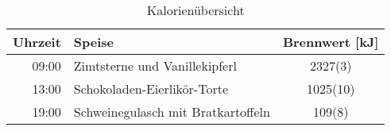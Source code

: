 \documentclass{scrartcl}
\begin{document}
\newcommand{\zeit}[2]{ #1:#2}

\begin{table}
\centering
\caption{Kalorienübersicht}
\label{tab:kalorien}
\begin{tabular}{r l S[separate-uncertainty]}
\toprule
\textbf{Uhrzeit} & \textbf{Speise} & \textbf{Brennwert [\si{\kilo\joule}]} \\ 
\midrule
\zeit{09}{00} & Zimtsterne und Vanillekipferl & 2327(3)\\
\zeit{13}{00} & Schokoladen-Eierlikör-Torte  & 1025(10)\\
\zeit{19}{00} & Schweinegulasch mit Bratkartoffeln & 109(8) \\
\end{tabular}
\end{table}
\end{document}
